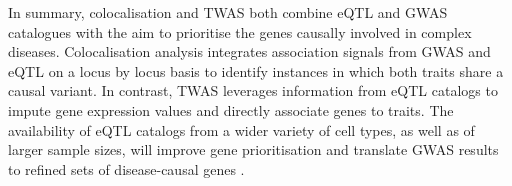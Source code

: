 
In summary, colocalisation and TWAS both combine eQTL and GWAS catalogues with the aim to prioritise the genes causally involved in complex diseases.
Colocalisation analysis integrates association signals from GWAS and eQTL on a locus by locus basis to identify instances in which both traits share a causal variant. 
In contrast, TWAS leverages information from eQTL catalogs to impute gene expression values and directly associate genes to traits. 
The availability of eQTL catalogs from a wider variety of cell types, as well as of larger sample sizes, will improve gene prioritisation and translate GWAS results to refined sets of disease-causal genes \cite{cano2020gwas}.



